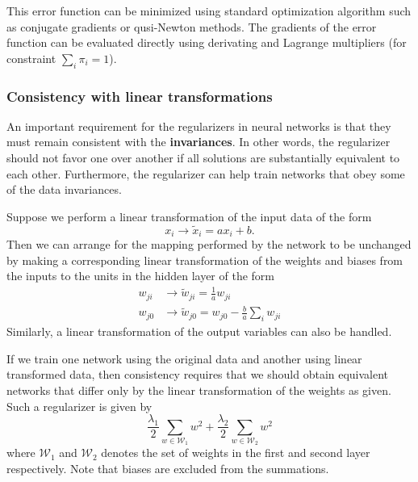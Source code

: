 \documentclass[a4paper]{report}
\renewcommand{\cal}{\mathcal}
\begin{document}
This error function can be minimized using standard optimization algorithm such as conjugate gradients or qusi-Newton methods. The gradients of the error function can be evaluated directly using derivating and Lagrange multipliers (for constraint $\sum_i \pi_i = 1$).

\subsubsection{Consistency with linear transformations}
An important requirement for the regularizers in neural networks is that they must remain consistent with the \textbf{invariances}. In other words, the regularizer should not favor one over another if all solutions are substantially equivalent to each other. Furthermore, the regularizer can help train networks that obey some of the data invariances.

Suppose we perform a linear transformation of the input data of the form
\begin{equation}
	x_i \rightarrow \tilde{x}_i = ax_i+b.
\end{equation}
Then we can arrange for the mapping performed by the network to be unchanged by making a corresponding linear transformation of the weights and biases from the inputs to the units in the hidden layer of the form
\begin{align}
	w_{ji} &\rightarrow \tilde{w}_{ji} = \frac{1}{a}w_{ji} \\
	w_{j0} &\rightarrow \tilde{w}_{j0} = w_{j0} - \frac{b}{a} \sum_i w_{ji}
\end{align}
Similarly, a linear transformation of the output variables can also be handled.

If we train one network using the original data and another using linear transformed data, then consistency requires that we should obtain equivalent networks that differ only by the linear transformation of the weights as given. Such a regularizer is given by
\begin{equation}
	\frac{\lambda_1}{2} \sum_{w \in \cal{W}_1} w^2 + \frac{\lambda_2}{2} \sum_{w \in \cal{W}_2} w^2
\end{equation}
where $\cal{W}_1$ and $\cal{W}_2$ denotes the set of weights in the first and second layer respectively. Note that biases are excluded from the summations.
\end{document}
